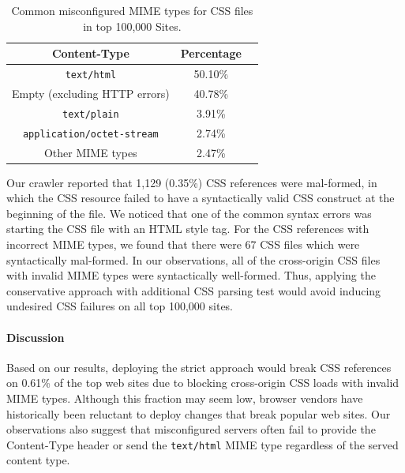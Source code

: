 \documentclass{acm_proc_article-sp}
\begin{document}
\begin{table}
\centering
\begin{tabular}{|c|c|c|} \hline
Content-Type&Percentage\\ \hline
\texttt{text/html}&50.10\%\\ \hline
Empty (excluding HTTP errors)&40.78\%\\ \hline
\texttt{text/plain}&3.91\%\\ \hline
\texttt{application/octet-stream}&2.74\%\\ \hline
Other MIME types&2.47\%\\
\hline\end{tabular}
\caption{Common misconfigured MIME types for CSS files in top 100,000 Sites.}
\label{table:MIME}
\end{table}

Our crawler reported that 1,129 (0.35\%) CSS references were mal-formed, in which the CSS resource failed to have a syntactically valid CSS construct at the beginning of the file. We noticed that one of the common syntax errors was starting the CSS file with an HTML style tag. For the CSS references with incorrect MIME types, we found that there were 67 CSS files which were syntactically mal-formed. In our observations, all of the cross-origin CSS files with invalid MIME types were syntactically well-formed. Thus, applying the conservative approach with additional CSS parsing test would avoid inducing undesired CSS failures on all top 100,000 sites.


\paragraph{Discussion}
Based on our results, deploying the strict approach would break CSS references on 0.61\% of the top web sites due to blocking cross-origin CSS loads with invalid MIME types. Although this fraction may seem low, browser vendors have historically been reluctant to deploy changes that break popular web sites. Our observations also suggest that misconfigured servers often fail to provide the Content-Type header or send the \texttt{text/html} MIME type regardless of the served content type.
\end{document}
